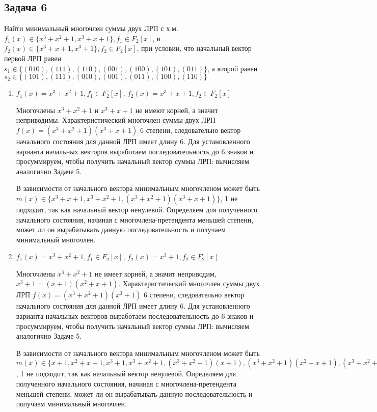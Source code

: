 \documentclass[12pt]{extarticle}
\begin{document}
\subsection{Задача 6}
Найти минимальный многочлен суммы двух ЛРП с х.м. $f_1(x)\in\{x^3+x^2+1, x^3+x+1\}, f_1\in F_2[x]$, и $f_2(x)\in\{x^3+x+1, x^3+1\}, f_2\in F_2[x]$, при условии, что начальный вектор первой ЛРП равен $s_1 \in \{(010), (111), (110), (001), (100),(101),(011)\}$, а второй равен $s_2 \in\{(101), (111), (010), (001), (011), (100), (110)\}$

\begin{enumerate}
    \item $f_1(x) = x^3+x^2+1, f_1\in F_2[x]$, $f_2(x) = x^3+x+1, f_2\in F_2[x]$
    
     Многочлены $x^3+x^2+1$ и $x^3+x+1$ не имеют корней, а значит неприводимы. Характеристический многочлен суммы двух ЛРП $f(x) = (x^3+x^2+1)(x^3+x+1)$ 6 степени, следовательно вектор начального состояния для данной ЛРП имеет длину 6. Для установленного варианта начальных векторов выработаем последовательность до 6 знаков и просуммируем, чтобы получить начальный вектор суммы ЛРП: вычисляем аналогично Задаче 5.
     
     В зависимости от начального вектора минимальным многочленом может быть $m(x)\in\{x^3+x+1, x^3+x^2+1, (x^3+x^2+1)(x^3+x+1)\}$, 1 не подходит, так как начальный вектор ненулевой. Определяем для полученного начального состояния, начиная с многочлена-претендента меньшей степени, может ли он вырабатывать данную последовательность и получаем минимальный многочлен.
     
     \item $f_1(x) = x^3+x^2+1, f_1\in F_2[x]$, $f_2(x) = x^3+1, f_2\in F_2[x]$
    
     Многочлены $x^3+x^2+1$  не имеет корней, а значит неприводим, $x^3+1 = (x+1)(x^2+x+1)$. Характеристический многочлен суммы двух ЛРП $f(x) = (x^3+x^2+1)(x^3+1)$ 6 степени, следовательно вектор начального состояния для данной ЛРП имеет длину 6. Для установленного варианта начальных векторов выработаем последовательность до 6 знаков и просуммируем, чтобы получить начальный вектор суммы ЛРП: вычисляем аналогично Задаче 5.
     
     В зависимости от начального вектора минимальным многочленом может быть $m(x)\in\{x+1, x^2+x+1, x^3+1, x^3+x^2+1, (x^3+x^2+1)(x+1), (x^3+x^2+1)(x^2+x+1), (x^3+x^2+1)(x^3+1)\}$, 1 не подходит, так как начальный вектор ненулевой. Определяем для полученного начального состояния, начиная с многочлена-претендента меньшей степени, может ли он вырабатывать данную последовательность и получаем минимальный многочлен.
     

\end{enumerate}
\end{document}
